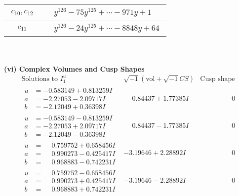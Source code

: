 \documentclass[1p]{elsarticle_modified}
\theoremstyle{definition}
\newcommand{\I}{\sqrt{-1}}
\begin{document}
\begin{tabular}{m{50pt}|m{274pt}}
\hline $$\begin{aligned}c_{10},c_{12}\end{aligned}$$&$\begin{aligned}
&y^{126}-75 y^{125}+\cdots-971 y+1
\end{aligned}$\\
\hline $$\begin{aligned}c_{11}\end{aligned}$$&$\begin{aligned}
&y^{126}-24 y^{125}+\cdots-8848 y+64
\end{aligned}$\\
\hline
\end{tabular}\\~\\
\newpage\flushleft \textbf{(vi) Complex Volumes and Cusp Shapes}
$$\begin{array}{c|c|c}  
\text{Solutions to }I^u_{1}& \I (\text{vol} + \sqrt{-1}CS) & \text{Cusp shape}\\
 \hline 
\begin{aligned}
u &= -0.583149 + 0.813259 I \\
a &= -2.27053 - 2.09717 I \\
b &= -2.12049 + 0.36398 I\end{aligned}
 & \phantom{-}0.84437 + 1.77385 I & \phantom{-0.000000 } 0 \\ \hline\begin{aligned}
u &= -0.583149 - 0.813259 I \\
a &= -2.27053 + 2.09717 I \\
b &= -2.12049 - 0.36398 I\end{aligned}
 & \phantom{-}0.84437 - 1.77385 I & \phantom{-0.000000 } 0 \\ \hline\begin{aligned}
u &= \phantom{-}0.759752 + 0.658456 I \\
a &= \phantom{-}0.990273 - 0.425417 I \\
b &= \phantom{-}0.968883 - 0.742231 I\end{aligned}
 & -3.19646 + 2.28892 I & \phantom{-0.000000 } 0 \\ \hline\begin{aligned}
u &= \phantom{-}0.759752 - 0.658456 I \\
a &= \phantom{-}0.990273 + 0.425417 I \\
b &= \phantom{-}0.968883 + 0.742231 I\end{aligned}
 & -3.19646 - 2.28892 I & \phantom{-0.000000 } 0 \\ \hline\begin{aligned}

\end{aligned}
\end{array}$$
\end{document}
